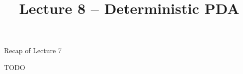 \documentclass[handout]{beamer}
\title{Lecture 8 -- Deterministic PDA}
\begin{document}
\frame{\titlepage}


\begin{frame}{Recap of Lecture 7}
	
    TODO
	
\end{frame}
\end{document}

